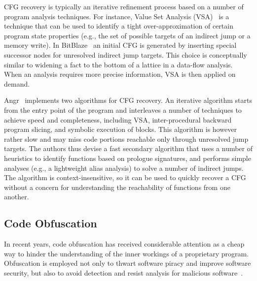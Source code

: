 CFG recovery is typically an iterative refinement process based on a number of program analysis techniques. For instance, Value Set Analysis (VSA)~\cite{VSA-CC04} is a technique that can be used to identify a tight over-approximation of certain program state properties (e.g., the set of possible targets of an indirect jump or a memory write). In {\sc BitBlaze}~\cite{BITBLAZE-ICISS08} an initial CFG is generated by inserting special successor nodes for unresolved indirect jump targets. This choice is conceptually similar to widening a fact to the bottom of a lattice in a data-flow analysis. When an analysis requires more precise information, VSA is then applied on demand. %

{\sc Angr}~\cite{ANGR-SSP16} implements two algorithms for CFG recovery. An iterative algorithm starts from the entry point of the program and interleaves a number of techniques to achieve speed and completeness, including VSA, inter-procedural backward program slicing, and symbolic execution of blocks. This algorithm is however rather slow and may miss code portions reachable only through unresolved jump targets. The authors thus devise a fast secondary algorithm that uses a number of heuristics to identify functions based on prologue signatures, and performs simple analyses (e.g., a lightweight alias analysis) to solve a number of indirect jumps. The algorithm is context-insensitive, so it can be used to quickly recover a CFG without a concern for understanding the reachability of functions from one another. 

\subsection{Code Obfuscation}
In recent years, code obfuscation has received considerable attention as a cheap way to hinder the understanding of the inner workings of a proprietary program. Obfuscation is employed not only to thwart software piracy and improve software security, but also to avoid detection and resist analysis for malicious software~\cite{UDM-WCRE15,YJW-SSP15}.

